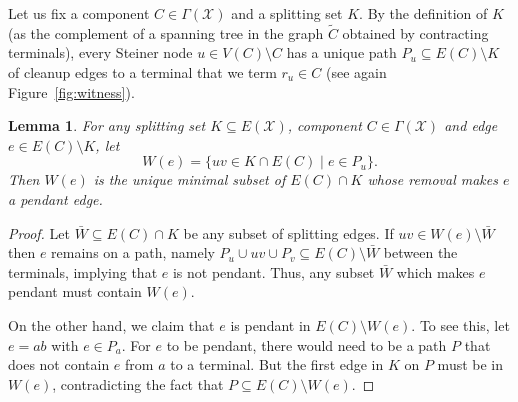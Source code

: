 \documentclass[11pt, letterpaper]{article}
\newtheorem{lemma}[theorem]{Lemma}
\theoremstyle{definition}
\newcommand{\grphx}{\mathcal{X}}
\newcommand{\compof}[1]{\Gamma(#1)}
\newcommand{\compx}{\compof{\grphx}}
\newcommand{\grd}{E(\grphx)}
\newcommand{\core}{K}
\begin{document}
Let us fix a component $C \in \compx$ and a splitting set $K$. 
By the definition of $K$ (as the complement of a spanning tree in  the graph $\tilde{C}$ obtained by
contracting terminals), every Steiner node $u \in V(C) \setminus C$ has a unique 
path $P_u \subseteq E(C) \setminus K$ of cleanup edges to a terminal that we term $r_u \in C$ (see again Figure~\ref{fig:witness}).
\begin{lemma}\label{lem:witness} 
	For any splitting set $\core \subseteq \grd$, component $C \in \compx$ and edge $e \in E(C) \setminus \core$, let
\[ W(e) = \{ uv \in \core \cap E(C) \mid e \in P_u \}. \]
Then $W(e)$ is the unique minimal subset of $E(C) \cap \core$ whose removal makes $e$ a pendant edge.
\end{lemma}
\begin{proof}
\iffalse
Let $\bar{W} \subseteq E(C) \cap K$ be \emph{some} minimal subset of splitting edges, whose removal makes $e$ a
pendant edge. Consider a set $B \subseteq K$ of removed core edges such that $\grphx - B$ is feasible.
Observe that in the blowup graph $\grphx - B$, the component $C$ is potentially split 
into several components. In fact, removing any further edge makes the blowup graph infeasible, 
if more connected components are created.

Consider a splitting edge $uv \in E(C) \setminus B$ that we decided not to remove. Then $r_u$ and $r_v$
are still in the same connected component. 
Now, the removal of any edge on $P_u$ or on $P_v$ would split the component containing $r_u$
and $r_v$ into two components. Thus $W(e) \subseteq \bar{W}$.

But vice versa, in the forest $E(C) \setminus W(e)$, the edge $e$ only connects Steiner nodes to
some terminal. Removing it, does not create new components. Thus the claim follows. \fi
Let $\bar{W} \subseteq E(C) \cap K$ be any subset of splitting
edges. If $uv\in W(e)\setminus \bar{W}$  then $e$ remains on a path,
namely $P_u \cup uv \cup P_v \subseteq E(C)\setminus\bar{W}$ between
the terminals, implying that $e$ is not pendant. Thus, any subset
$\bar{W}$ which makes $e$ pendant must contain $W(e)$. 

On the other hand, we claim that $e$ is pendant in $E(C)\setminus
W(e)$. To see this, let $e=ab$ with $e\in P_a$. For $e$ to be pendant,
there would need to be a path $P$ that does not contain $e$ from $a$
to a terminal. But the first edge in $K$ on $P$ must be in $W(e)$,
contradicting the fact that $P\subseteq E(C)\setminus W(e)$.  
\end{proof}
\end{document}
